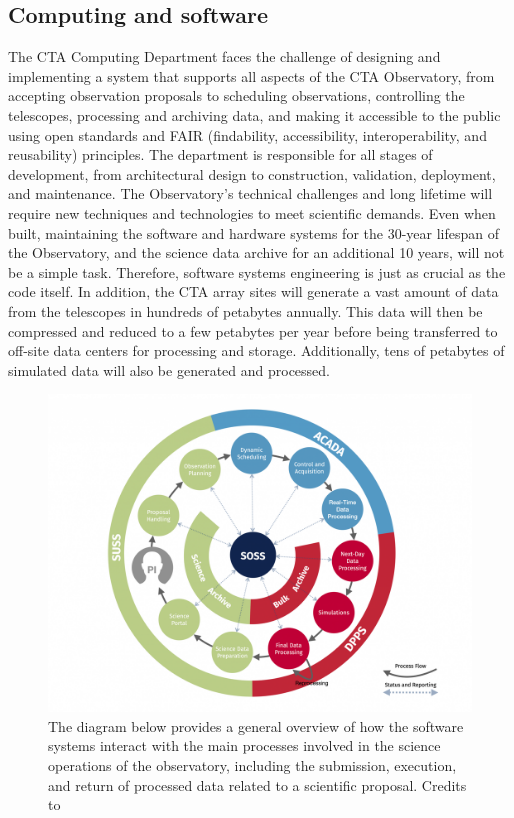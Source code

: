 \subsection{Computing and software}
The CTA Computing Department faces the challenge of designing and implementing a system that supports all aspects of the CTA Observatory, from accepting observation proposals to scheduling observations, controlling the telescopes, processing and archiving data, and making it accessible to the public using open standards and FAIR (findability, accessibility, interoperability, and reusability) principles. The department is responsible for all stages of development, from architectural design to construction, validation, deployment, and maintenance. The Observatory's technical challenges and long lifetime will require new techniques and technologies to meet scientific demands. Even when built, maintaining the software and hardware systems for the 30-year lifespan of the Observatory, and the science data archive for an additional 10 years, will not be a simple task. Therefore, software systems engineering is just as crucial as the code itself. In addition, the CTA array sites will generate a vast amount of data from the telescopes in hundreds of petabytes annually. This data will then be compressed and reduced to a few petabytes per year before being transferred to off-site data centers for processing and storage. Additionally, tens of petabytes of simulated data will also be generated and processed.
\begin{figure}[ht]
\centering
\includegraphics[width=0.9\linewidth]{figures/introduction/cta-softwares.png}
\caption{The diagram below provides a general overview of how the software systems interact with the main processes involved in the science operations of the observatory, including the submission, execution, and return of processed data related to a scientific proposal. Credits to \cite{ctaobservatorywebsite}}
\label{fig:cta-softwares}
\end{figure}
